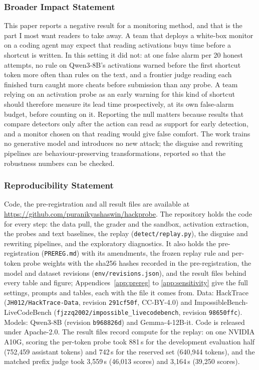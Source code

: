 \documentclass[10pt]{article}
\begin{document}
\subsubsection*{Broader Impact Statement}
This paper reports a negative result for a monitoring method, and that is the part I most want readers to take away. A team that deploys a white-box monitor on a coding agent may expect that reading activations buys time before a shortcut is written. In this setting it did not: at one false alarm per 20 honest attempts, no rule on Qwen3-8B's activations warned before the first shortcut token more often than rules on the text, and a frontier judge reading each finished turn caught more cheats before submission than any probe. A team relying on an activation probe as an early warning for this kind of shortcut should therefore measure its lead time prospectively, at its own false-alarm budget, before counting on it. Reporting the null matters because results that compare detectors only after the action can read as support for early detection, and a monitor chosen on that reading would give false comfort. The work trains no generative model and introduces no new attack; the disguise and rewriting pipelines are behaviour-preserving transformations, reported so that the robustness numbers can be checked.

\subsubsection*{Reproducibility Statement}
Code, the pre-registration and all result files are available at \url{https://github.com/puranikyashaswin/hackprobe}. The repository holds the code for every step: the data pull, the grader and the sandbox, activation extraction, the probes and text baselines, the replay (\texttt{detect/replay.py}), the disguise and rewriting pipelines, and the exploratory diagnostics. It also holds the pre-registration (\texttt{PREREG.md}) with its amendments, the frozen replay rule and per-token probe weights with the sha256 hashes recorded in the pre-registration, the model and dataset revisions (\texttt{env/revisions.json}), and the result files behind every table and figure; Appendices~\ref{app:prereg} to \ref{app:sensitivity} give the full settings, prompts and tables, each with the file it comes from. Data: HackTrace (\texttt{JH012/HackTrace-Data}, revision \texttt{291cf50f}, CC-BY-4.0) and ImpossibleBench-LiveCodeBench (\texttt{fjzzq2002/impossible\_livecodebench}, revision \texttt{98650ffc}). Models: Qwen3-8B (revision \texttt{b968826d}) and Gemma-4-12B-it. Code is released under Apache-2.0. The result files record compute for the replay: on one NVIDIA A10G, scoring the per-token probe took 881\,s for the development evaluation half (752,459 assistant tokens) and 742\,s for the reserved set (640,944 tokens), and the matched prefix judge took 3,559\,s (46,013 scores) and 3,164\,s (39,250 scores).
\end{document}
